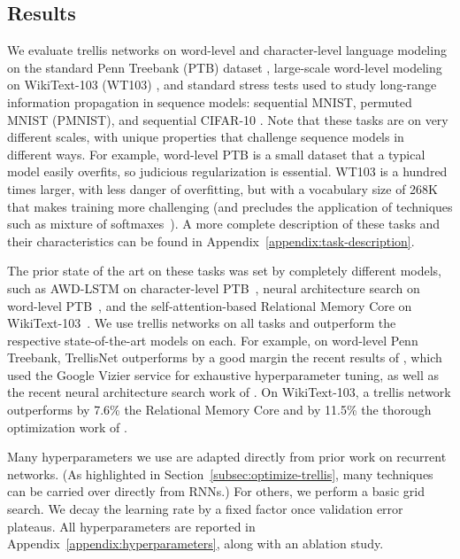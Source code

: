 \documentclass{article} \usepackage{iclr2019_conference,times}
\begin{document}
\subsection{Results}

We evaluate trellis networks on word-level and character-level language modeling on the standard Penn Treebank (PTB) dataset \citep{Marcus93buildinga,Mikolov2010PTB}, large-scale word-level modeling on WikiText-103 (WT103) \citep{merity2016pointer}, and standard stress tests used to study long-range information propagation in sequence models: sequential MNIST, permuted MNIST (PMNIST), and sequential CIFAR-10 \citep{chang2017dilated,bai2018empirical,trinh2018learning}. Note that these tasks are on very different scales, with unique properties that challenge sequence models in different ways. For example, word-level PTB is a small dataset that a typical model easily overfits, so judicious regularization is essential. WT103 is a hundred times larger, with less danger of overfitting, but with a vocabulary size of 268K that makes training more challenging (and precludes the application of techniques such as mixture of softmaxes~\citep{yang2018breaking}). A more complete description of these tasks and their characteristics can be found in Appendix~\ref{appendix:task-description}.

The prior state of the art on these tasks was set by completely different models, such as AWD-LSTM on character-level PTB~\citep{merity2018analysis}, neural architecture search on word-level PTB~\citep{pham2018efficient}, and the self-attention-based Relational Memory Core on \mbox{WikiText-103}~\citep{santoro2018relational}. We use trellis networks on all tasks and outperform the respective state-of-the-art models on each. For example, on word-level Penn Treebank, TrellisNet outperforms by a good margin the recent results of \cite{Melis2018}, which used the Google Vizier service for exhaustive hyperparameter tuning, as well as the recent neural architecture search work of \cite{pham2018efficient}. On WikiText-103, a trellis network outperforms by 7.6\% the Relational Memory Core \citep{santoro2018relational} and by 11.5\% the thorough optimization work of \cite{merity2018analysis}.


Many hyperparameters we use are adapted directly from prior work on recurrent networks. (As highlighted in Section~\ref{subsec:optimize-trellis}, many techniques can be carried over directly from RNNs.) For others, we perform a basic grid search. We decay the learning rate by a fixed factor once validation error plateaus. All hyperparameters are reported in Appendix~\ref{appendix:hyperparameters}, along with an ablation study.
\end{document}
